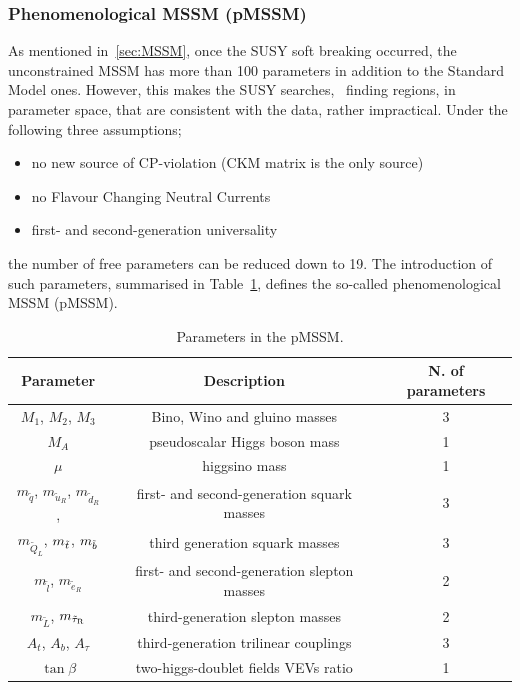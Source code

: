 			\subsubsection*{Phenomenological MSSM (pMSSM)}

				As mentioned in~\ref{sec:MSSM}, once the SUSY soft breaking occurred, the unconstrained MSSM has more than 100 parameters in addition to the Standard Model ones. However, this makes the SUSY searches, \eg\ finding regions, in parameter space, that are consistent with the data, rather impractical. Under the following three assumptions; 

				\begin{itemize}
					\item no new source of CP-violation (CKM matrix is the only source)
					\item no Flavour Changing Neutral Currents
					\item first- and second-generation universality
				\end{itemize}
				
				\noindent the number of free parameters can be reduced down to 19. The introduction of such parameters, summarised in Table~\ref{tab:MSSM_mainFreePar}, defines the so-called phenomenological MSSM (pMSSM).
				
				\begin{table}[!htb]\centering\caption{Parameters in the pMSSM.}
					\begin{tabular}{c|c|c}
					\hline
					\textbf{Parameter} & \textbf{Description} & \textbf{N. of parameters} \\ \hline \hline

					$M_1$, $M_2$, $M_3$ & Bino, Wino and gluino masses & 3 \\ \hline

					$M_{A}$	& pseudoscalar Higgs boson mass	& 1 \\\hline
					$\mu$  & higgsino mass & 1 \\\hline

					$m_{\tilde{q}}$, $m_{\tilde{u}_R}$, $m_{\tilde{d}_R}$, & first- and second-generation squark masses & 3 \\
					$m_{\tilde{Q}_L}$, $m_{\tilde{t}}$, $m_{\tilde{b}}$ & third generation squark masses	&  3 \\\hline

					$m_{\tilde{l}}$, $m_{\tilde{e}_R}$ & first- and second-generation slepton masses	 & 2 \\
					$m_{\tilde{L}}$, $m_{\tilde{\tau}_{\mathrm{R}}}$ & third-generation slepton masses	& 2 \\\hline

					$A_t$, $A_b$, $A_{\tau}$ & third-generation trilinear couplings	& 3 \\\hline

					$\tan \beta$ & two-higgs-doublet fields VEVs ratio & 1 \\ 
					\hline
					\end{tabular}
				\label{tab:MSSM_mainFreePar} 
				\end{table}

